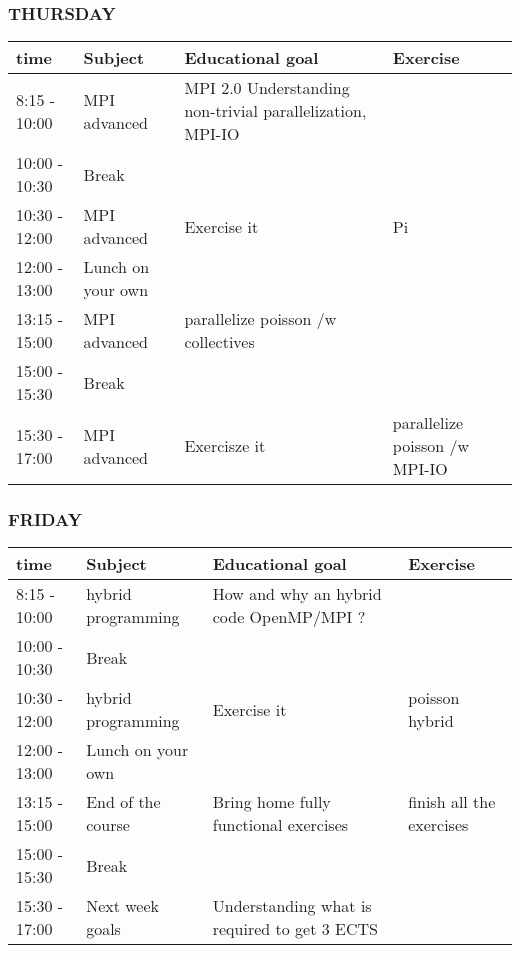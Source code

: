 \begin{frame}[containsverbatim]
\frametitle{THURSDAY}
\scriptsize
\begin{tabular}{| l | m{2.5cm} | m{2.5cm} | m{2.5cm} | }
\hline
 \textbf{time} & \textbf{Subject} & \textbf{Educational goal}& \textbf{Exercise} \\
\hline
\hline
8:15 - 10:00 & MPI advanced& MPI 2.0 Understanding non-trivial parallelization, MPI-IO & \\
\hline
10:00 - 10:30 & Break & & \\
\hline
10:30 - 12:00 & MPI advanced& Exercise it & Pi\\
\hline
12:00 - 13:00 & Lunch on your own & & \\
\hline
13:15 - 15:00 & MPI advanced& parallelize poisson /w collectives & \\
\hline
15:00 - 15:30 & Break &  & \\
\hline
15:30 - 17:00 & MPI advanced& Exercisze it & parallelize poisson /w MPI-IO\\
\hline
\end{tabular}
\end{frame}




\begin{frame}[containsverbatim]
\frametitle{FRIDAY}
\scriptsize
\begin{tabular}{| l | m{2.5cm} | m{2.5cm} | m{2.5cm} | }
\hline
 \textbf{time} & \textbf{Subject} & \textbf{Educational goal}& \textbf{Exercise} \\
\hline
\hline
8:15 - 10:00 & hybrid programming& How and why an hybrid code OpenMP/MPI ? & \\
\hline
10:00 - 10:30 & Break & & \\
\hline
10:30 - 12:00 & hybrid programming& Exercise it & poisson hybrid \\
\hline
12:00 - 13:00 & Lunch on your own & & \\
\hline
13:15 - 15:00 & End of the course & Bring home fully functional exercises & finish all the exercises\\
\hline
15:00 - 15:30 & Break & & \\
\hline
15:30 - 17:00 & Next week goals & Understanding what is required to get 3 ECTS & \\
\hline
\end{tabular}
\end{frame}


